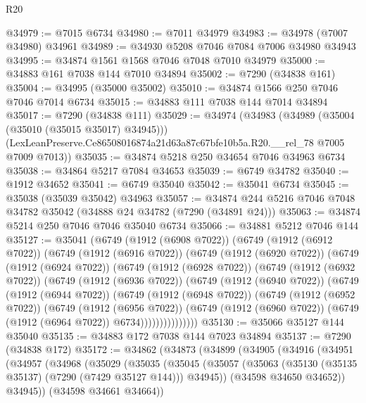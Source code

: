 \begin{lexlean}{R20}
\begin{coremodule}
{@34979 := @7015 @6734
@34980 := @7011 @34979
@34983 := @34978 (@7007 @34980) @34961
@34989 := @34930 @5208 @7046 @7084 @7006 @34980 @34943
@34995 := @34874 @1561 @1568 @7046 @7048 @7010 @34979
@35000 := @34883 @161 @7038 @144 @7010 @34894
@35002 := @7290 (@34838 @161)
@35004 := @34995 (@35000 @35002)
@35010 := @34874 @1566 @250 @7046 @7046 @7014 @6734
@35015 := @34883 @111 @7038 @144 @7014 @34894
@35017 := @7290 (@34838 @111)
@35029 := @34974
    (@34983
      (@34989 (@35004 (@35010 (@35015 @35017) @34945)))
      (LexLeanPreserve.Ce86508016874a21d63a87c67bfe10b5a.R20.__rel_78 @7005 @7009 @7013))
@35035 := @34874 @5218 @250 @34654 @7046 @34963 @6734
@35038 := @34864 @5217 @7084 @34653
@35039 := @6749 @34782
@35040 := @1912 @34652
@35041 := @6749 @35040
@35042 := @35041 @6734
@35045 := @35038 (@35039 @35042) @34963
@35057 := @34874 @244 @5216 @7046 @7048 @34782 @35042 (@34888 @24 @34782 (@7290 (@34891 @24)))
@35063 := @34874 @5214 @250 @7046 @7046 @35040 @6734
@35066 := @34881 @5212 @7046 @144
@35127 := @35041
    (@6749
      (@1912 (@6908 @7022))
      (@6749
        (@1912 (@6912 @7022))
        (@6749
          (@1912 (@6916 @7022))
          (@6749
            (@1912 (@6920 @7022))
            (@6749
              (@1912 (@6924 @7022))
              (@6749
                (@1912 (@6928 @7022))
                (@6749
                  (@1912 (@6932 @7022))
                  (@6749
                    (@1912 (@6936 @7022))
                    (@6749
                      (@1912 (@6940 @7022))
                      (@6749
                        (@1912 (@6944 @7022))
                        (@6749
                          (@1912 (@6948 @7022))
                          (@6749
                            (@1912 (@6952 @7022))
                            (@6749
                              (@1912 (@6956 @7022))
                              (@6749
                                (@1912 (@6960 @7022))
                                (@6749 (@1912 (@6964 @7022)) @6734)))))))))))))))
@35130 := @35066 @35127 @144 @35040
@35135 := @34883 @172 @7038 @144 @7023 @34894
@35137 := @7290 (@34838 @172)
@35172 := @34862
    (@34873
      (@34899
        (@34905
          (@34916
            (@34951
              (@34957
                (@34968
                  (@35029
                    (@35035
                      (@35045
                        (@35057
                          (@35063 (@35130 (@35135 @35137) (@7290 (@7429 @35127 @144))) @34945))
                        (@34598 @34650 @34652))
                      @34945))
                  (@34598 @34661 @34664))
}
\end{coremodule}
\end{lexlean}
